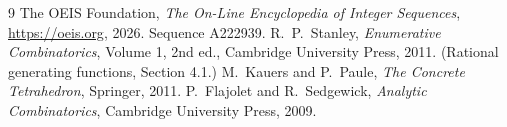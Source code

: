 \documentclass[11pt,a4paper]{article}
\theoremstyle{plain}
\theoremstyle{definition}
\begin{document}
\begin{thebibliography}{9}
 The OEIS Foundation, \emph{The On-Line Encyclopedia of Integer
Sequences}, \url{https://oeis.org}, 2026. Sequence A222939.
 R.~P.~Stanley, \emph{Enumerative Combinatorics}, Volume 1, 2nd ed.,
Cambridge University Press, 2011. (Rational generating functions, Section 4.1.)
 M.~Kauers and P.~Paule, \emph{The Concrete Tetrahedron}, Springer, 2011.
 P.~Flajolet and R.~Sedgewick, \emph{Analytic Combinatorics}, Cambridge
University Press, 2009.
\end{thebibliography}
\end{document}
